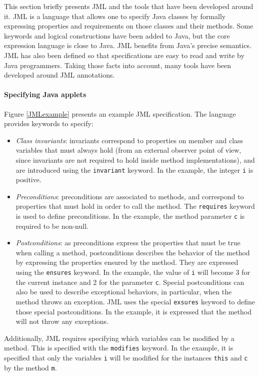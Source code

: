 \label{JavaModellingLanguage}
 This section briefly presents JML and the tools that have been
 developed around it.  JML \cite{LBR00} is a language that allows one to
 specify Java classes by formally expressing properties and
 requirements on those classes and their methods.  Some keywords and
 logical constructions have been added to Java, but the core
 expression language is close to Java.  JML benefits from Java's
 precise semantics.  JML has also been defined so that specifications
 are easy to read and write by Java programmers.  Taking those facts
 into account, many tools have been developed around JML annotations.

\paragraph{Specifying Java applets}
 Figure \ref{JMLexample} presents an example JML specification. The
 language provides keywords to specify:
\begin{itemize}
 \item \textit{Class invariants}: invariants correspond to properties
 on member and class variables that must always hold (from an external
 observer point of view, since invariants are not required to hold
 inside method implementations), and are introduced using the
 \texttt{invariant} keyword.
In the example, the integer \texttt{i} is positive.
 \item \textit{Preconditions}: preconditions are associated to methods, and correspond to properties that must hold in order to
call the method. The \texttt{requires} keyword is used to define
 preconditions. In the example, the method parameter \texttt{c} is
required to be non-null.
 \item \textit{Postconditions}: as preconditions express the properties that must be true when calling a
method, postconditions describes the behavior of the method by
 expressing the properties ensured by the method. They are expressed
 using the \texttt{ensures} keyword.
In the example, the value of \texttt{i} will become 3 for the current
instance and 2 for the parameter \texttt{c}.
 Special postconditions can also be used to describe exceptional behaviors, in particular, when
the method throws an exception. JML uses the special \texttt{exsures}
 keyword to define those special postconditions. In the example, it is
 expressed that the method will not throw any exceptions.
\end{itemize}

Additionally, JML requires specifying which variables can be modified
by a method. This is specified with the \texttt{modifies} keyword.
In the example, it is specified that only the variables
\texttt{i} will be modified for the instances \texttt{this} and
\texttt{c} by the method \texttt{m}.

